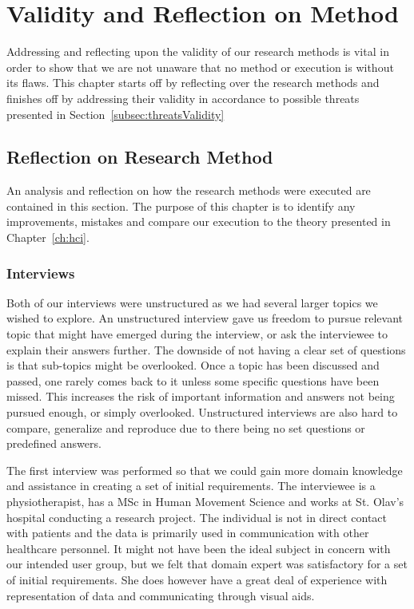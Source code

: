 \chapter{Validity and Reflection on Method}
Addressing and reflecting upon the validity of our research methods is vital in order to show that we are not unaware that no method or execution is without its flaws. This chapter starts off by reflecting over the research methods and finishes off by addressing their validity in accordance to possible threats presented in Section~\ref{subsec:threatsValidity} 

\section{Reflection on Research Method}
An analysis and reflection on how the research methods were executed are contained in this section. The purpose of this chapter is to identify any improvements, mistakes and compare our execution to the theory presented in Chapter~\ref{ch:hci}.

\subsection{Interviews}
Both of our interviews were unstructured as we had several larger topics we wished to explore. An unstructured interview gave us freedom to pursue relevant topic that might have emerged during the interview, or ask the interviewee to explain their answers further. The downside of not having a clear set of questions is that sub-topics might be overlooked. Once a topic has been discussed and passed, one rarely comes back to it unless some specific questions have been missed. This increases the risk of important information and answers not being pursued enough, or simply overlooked. Unstructured interviews are also hard to compare, generalize and reproduce due to there being no set questions or predefined answers.

The first interview was performed so that we could gain more domain knowledge and assistance in creating a set of initial requirements. The interviewee is a physiotherapist, has a MSc in Human Movement Science and works at St. Olav's hospital conducting a research project. The individual is not in direct contact with patients and the data is primarily used in communication with other healthcare personnel. It might not have been the ideal subject in concern with our intended user group, but we felt that domain expert was satisfactory for a set of initial requirements. She does however have a great deal of experience with representation of data and communicating through visual aids.

